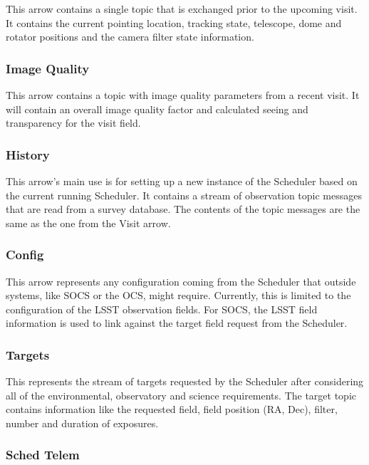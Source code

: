 \documentclass[]{spie}  %
\begin{document}
This arrow contains a single topic that is exchanged prior to the upcoming visit. It contains the current pointing location, tracking state, telescope, dome and rotator positions and the camera filter state information.

\subsubsection{Image Quality}

This arrow contains a topic with image quality parameters from a recent visit. It will contain an overall image quality factor and calculated seeing and transparency for the visit field.

\subsubsection{History}

This arrow's main use is for setting up a new instance of the Scheduler based on the current running Scheduler. It contains a stream of observation topic messages that are read from a survey database. The contents of the topic messages are the same as the one from the Visit arrow.

\subsubsection{Config}

This arrow represents any configuration coming from the Scheduler that outside systems, like SOCS or the OCS, might require. Currently, this is limited to the configuration of the LSST observation fields. For SOCS, the LSST field information is used to link against the target field request from the Scheduler.

\subsubsection{Targets}

This represents the stream of targets requested by the Scheduler after considering all of the environmental, observatory and science requirements. The target topic contains information like the requested field, field position (RA, Dec), filter, number and duration of exposures. 

\subsubsection{Sched Telem}
\end{document}
